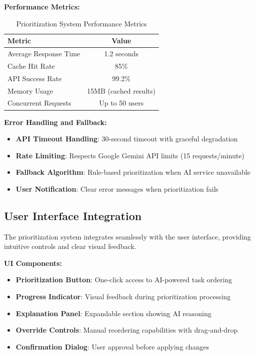 \textbf{Performance Metrics:}
\begin{table}[H]
\centering
\begin{tabular}{|l|c|}
\hline
\textbf{Metric} & \textbf{Value} \\
\hline
Average Response Time & 1.2 seconds \\
\hline
Cache Hit Rate & 85\% \\
\hline
API Success Rate & 99.2\% \\
\hline
Memory Usage & 15MB (cached results) \\
\hline
Concurrent Requests & Up to 50 users \\
\hline
\end{tabular}
\caption{Prioritization System Performance Metrics}
\end{table}

\textbf{Error Handling and Fallback:}
\begin{itemize}
    \item \textbf{API Timeout Handling}: 30-second timeout with graceful degradation
    \item \textbf{Rate Limiting}: Respects Google Gemini API limits (15 requests/minute)
    \item \textbf{Fallback Algorithm}: Rule-based prioritization when AI service unavailable
    \item \textbf{User Notification}: Clear error messages when prioritization fails
\end{itemize}

\subsection{User Interface Integration}

The prioritization system integrates seamlessly with the user interface, providing intuitive controls and clear visual feedback.

\textbf{UI Components:}
\begin{itemize}
    \item \textbf{Prioritization Button}: One-click access to AI-powered task ordering
    \item \textbf{Progress Indicator}: Visual feedback during prioritization processing
    \item \textbf{Explanation Panel}: Expandable section showing AI reasoning
    \item \textbf{Override Controls}: Manual reordering capabilities with drag-and-drop
    \item \textbf{Confirmation Dialog}: User approval before applying changes
\end{itemize}

